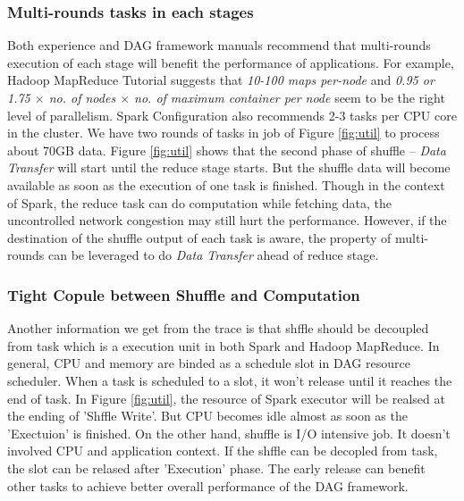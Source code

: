 \subsubsection{Multi-rounds tasks in each stages}\label{multi}
Both experience and DAG framework manuals recommend that multi-rounds execution of each stage will benefit the performance of applications.
For example, Hadoop MapReduce Tutorial \cite{hadooptutorial} suggests that \textit{10-100 maps per-node} and \textit{0.95 or 1.75 $\times$ no. of nodes $\times$ no. of maximum container per node} seem to be the right level of parallelism. Spark Configuration also recommends 2-3 tasks per CPU core in the cluster\cite{sparkconf}.
We have two rounds of tasks in job of Figure \ref{fig:util} to process about 70GB data. Figure \ref{fig:util} shows that the second phase of shuffle -- \textit{Data Transfer} will start until the reduce stage starts.
But the shuffle data will become available as soon as the execution of one task is finished. Though in the context of Spark, the reduce task can do computation while fetching data, the uncontrolled network congestion may still hurt the performance. However, if the destination of the shuffle output of each task is aware, the property of multi-rounds can be leveraged to do \textit{Data Transfer} ahead of reduce stage.

\subsubsection{Tight Copule between Shuffle and Computation}
Another information we get from the trace is that shffle should be decoupled from task which is a execution unit in both Spark and Hadoop MapReduce. In general, CPU and memory are binded as a schedule slot in DAG resource scheduler. When a task is scheduled to a slot, it won't release until it reaches the end of task. In Figure \ref{fig:util}, the resource of Spark executor will be realsed at the ending of 'Shffle Write'.
But CPU becomes idle almost as soon as the 'Exectuion' is finished. On the other hand, shuffle is I/O intensive job. It doesn't involved CPU and application context. If the shffle can be decopled from task, the slot can be relased after 'Execution' phase. The early release can benefit other tasks to achieve better overall performance of the DAG framework.

